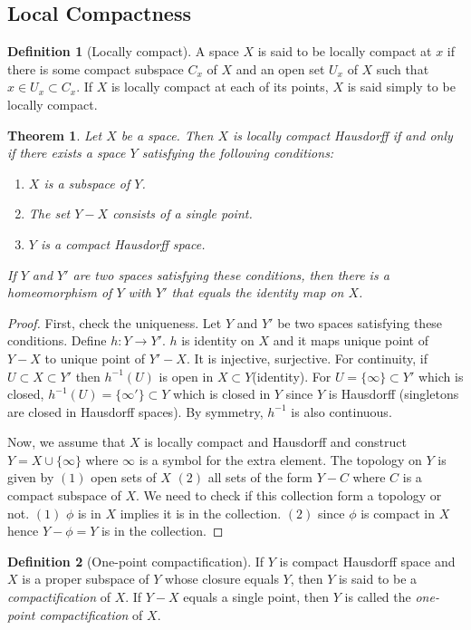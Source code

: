 \documentclass[12pt,reqno]{amsart}
\theoremstyle{plain}
\newtheorem{thm}{Theorem}
\theoremstyle{definition}
\newtheorem{defn}{Definition}
\begin{document}
\subsection{Local Compactness}
\begin{defn}[Locally compact]
    A space $X$ is said to be locally compact at $x$ if there is some compact subspace $C_x$ of $X$ and an open set $U_x$ of $X$ such that $x \in U_x \subset C_x$. If $X$ is locally compact at each of its points, $X$ is said simply to be locally compact.
\end{defn}
\begin{thm}
    Let $X$ be a space. Then $X$ is locally compact Hausdorff if and only if there exists a space $Y$ satisfying the following conditions:
    \begin{enumerate}
        \item $X$ is a subspace of $Y$.
        \item The set $Y-X$ consists of a single point.
        \item $Y$ is a compact Hausdorff space.
    \end{enumerate}
    If $Y$ and $Y'$ are two spaces satisfying these conditions, then there is a homeomorphism of $Y$ with $Y'$ that equals the identity map on $X$.
\end{thm}
\begin{proof}
    First, check the uniqueness. Let $Y$ and $Y'$ be two spaces satisfying these conditions. Define $h:Y \to Y'$. $h$ is identity on $X$ and it maps unique point of $Y-X$ to unique point of $Y'-X$. It is injective, surjective. For continuity, if $U \subset X \subset Y'$ then $h^{-1}(U)$ is open in $X \subset Y$(identity). For $U = \{\infty\} \subset Y'$ which is closed, $h^{-1}(U) = \{\infty'\} \subset Y$ which is closed in $Y$ since $Y$ is Hausdorff (singletons are closed in Hausdorff spaces). By symmetry, $h^{-1}$ is also continuous.

    Now, we assume that $X$ is locally compact and Hausdorff and construct $Y = X \cup \{\infty\}$ where $\infty$ is a symbol for the extra element. The topology on $Y$ is given by $(1)$ open sets of $X$ $(2)$ all sets of the form $Y - C$ where $C$ is a compact subspace of $X$. We need to check if this collection form a topology or not. $(1)$ $\phi$ is in $X$ implies it is in the collection. $(2)$ since $\phi$ is compact in $X$ hence $Y - \phi = Y$ is in the collection.  
\end{proof}

\begin{defn}[One-point compactification]
    If $Y$ is compact Hausdorff space and $X$ is a proper subspace of $Y$ whose closure equals $Y$, then $Y$ is said to be a {\it compactification} of $X$. If $Y-X$ equals a single point, then $Y$ is called the {\it one-point compactification} of $X$.
\end{defn}
\end{document}
